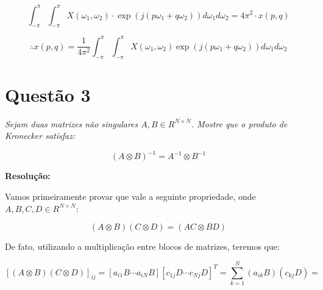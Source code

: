 \documentclass[]{abntex2}
\begin{document}
\begin{equation*}
	\int_{-\pi}^{\pi} \int_{-\pi}^{\pi}X(\omega_1, \omega_2) \cdot \exp \left( j (p \omega_1 + q \omega_2) \right)d\omega_1 d\omega_2 = 4\pi^{2}\cdot x(p,q)
\end{equation*}

\begin{tcolorbox}
	\[
		\therefore x(p, q) = \frac{1}{4\pi^2} \int_{-\pi}^{\pi} \int_{-\pi}^{\pi} X(\omega_1, \omega_2) \exp \left( j (p \omega_1 + q \omega_2) \right) d\omega_1 d\omega_2
	\]
	\end{tcolorbox}


\section*{\textbf{Questão 3}}

\textit{Sejam duas matrizes não singulares $A,B \in R^{N \times N}$. Mostre que o produto de Kronecker satisfaz:}

\begin{equation}
	{(A \otimes B)}^{-1} = A^{-1} \otimes B^{-1}
	\label{eq:inv}
\end{equation}

\textbf{Resolução:}

Vamos primeiramente provar que vale a seguinte propriedade, onde $A,B,C,D \in R^{N \times N}$:

\begin{equation*}
	(A \otimes B)(C \otimes D) = (AC \otimes BD)
\end{equation*}

De fato, utilizando a multiplicação entre blocos de matrizes, teremos que:

\begin{equation*}
	{[(A \otimes B)(C \otimes D)]}_{ij} = [a_{i1}B \cdots a_{iN}B][c_{1j}D \cdots c_{Nj}D]^{T} = \sum_{k=1}^{N} (a_{ik}B)(c_{kj}D) = 
\end{equation*}
\end{document}
